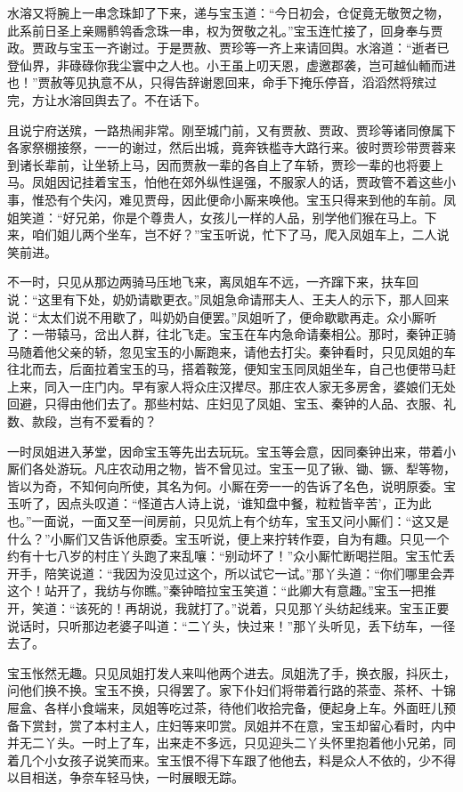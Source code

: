 \documentclass[12pt,oneside]{book}
\begin{document}
水溶又将腕上一串念珠卸了下来，递与宝玉道：“今日初会，仓促竟无敬贺之物，此系前日圣上亲赐鹡鸰香念珠一串，权为贺敬之礼。”宝玉连忙接了，回身奉与贾政。贾政与宝玉一齐谢过。于是贾赦、贾珍等一齐上来请回舆。水溶道：“逝者已登仙界，非碌碌你我尘寰中之人也。小王虽上叨天恩，虚邀郡袭，岂可越仙輀而进也！”贾赦等见执意不从，只得告辞谢恩回来，命手下掩乐停音，滔滔然将殡过完，方让水溶回舆去了。不在话下。

且说宁府送殡，一路热闹非常。刚至城门前，又有贾赦、贾政、贾珍等诸同僚属下各家祭棚接祭，一一的谢过，然后出城，竟奔铁槛寺大路行来。彼时贾珍带贾蓉来到诸长辈前，让坐轿上马，因而贾赦一辈的各自上了车轿，贾珍一辈的也将要上马。凤姐因记挂着宝玉，怕他在郊外纵性逞强，不服家人的话，贾政管不着这些小事，惟恐有个失闪，难见贾母，因此便命小厮来唤他。宝玉只得来到他的车前。凤姐笑道：“好兄弟，你是个尊贵人，女孩儿一样的人品，别学他们猴在马上。下来，咱们姐儿两个坐车，岂不好？”宝玉听说，忙下了马，爬入凤姐车上，二人说笑前进。

不一时，只见从那边两骑马压地飞来，离凤姐车不远，一齐蹿下来，扶车回说：“这里有下处，奶奶请歇更衣。”凤姐急命请邢夫人、王夫人的示下，那人回来说：“太太们说不用歇了，叫奶奶自便罢。”凤姐听了，便命歇歇再走。众小厮听了：一带辕马，岔出人群，往北飞走。宝玉在车内急命请秦相公。那时，秦钟正骑马随着他父亲的轿，忽见宝玉的小厮跑来，请他去打尖。秦钟看时，只见凤姐的车往北而去，后面拉着宝玉的马，搭着鞍笼，便知宝玉同凤姐坐车，自己也便带马赶上来，同入一庄门内。早有家人将众庄汉撵尽。那庄农人家无多房舍，婆娘们无处回避，只得由他们去了。那些村姑、庄妇见了凤姐、宝玉、秦钟的人品、衣服、礼数、款段，岂有不爱看的？

一时凤姐进入茅堂，因命宝玉等先出去玩玩。宝玉等会意，因同秦钟出来，带着小厮们各处游玩。凡庄农动用之物，皆不曾见过。宝玉一见了锹、锄、镢、犁等物，皆以为奇，不知何向所使，其名为何。小厮在旁一一的告诉了名色，说明原委。宝玉听了，因点头叹道：“怪道古人诗上说，‘谁知盘中餐，粒粒皆辛苦’，正为此也。”一面说，一面又至一间房前，只见炕上有个纺车，宝玉又问小厮们：“这又是什么？”小厮们又告诉他原委。宝玉听说，便上来拧转作耍，自为有趣。只见一个约有十七八岁的村庄丫头跑了来乱嚷：“别动坏了！”众小厮忙断喝拦阻。宝玉忙丢开手，陪笑说道：“我因为没见过这个，所以试它一试。”那丫头道：“你们哪里会弄这个！站开了，我纺与你瞧。”秦钟暗拉宝玉笑道：“此卿大有意趣。”宝玉一把推开，笑道：“该死的！再胡说，我就打了。”说着，只见那丫头纺起线来。宝玉正要说话时，只听那边老婆子叫道：“二丫头，快过来！”那丫头听见，丢下纺车，一径去了。

宝玉怅然无趣。只见凤姐打发人来叫他两个进去。凤姐洗了手，换衣服，抖灰土，问他们换不换。宝玉不换，只得罢了。家下仆妇们将带着行路的茶壶、茶杯、十锦屉盒、各样小食端来，凤姐等吃过茶，待他们收拾完备，便起身上车。外面旺儿预备下赏封，赏了本村主人，庄妇等来叩赏。凤姐并不在意，宝玉却留心看时，内中并无二丫头。一时上了车，出来走不多远，只见迎头二丫头怀里抱着他小兄弟，同着几个小女孩子说笑而来。宝玉恨不得下车跟了他他去，料是众人不依的，少不得以目相送，争奈车轻马快，一时展眼无踪。
\end{document}
